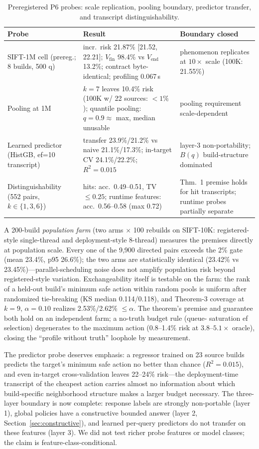 \documentclass{article}
\begin{document}
\begin{table}[t]
\centering
\caption{Preregistered P6 probes: scale replication, pooling boundary, predictor transfer, and transcript
distinguishability.}
\label{tab:p6}
\footnotesize
\setlength{\tabcolsep}{3pt}
\begin{tabular}{p{3.2cm}p{6.3cm}p{4.2cm}}
\toprule
Probe & Result & Boundary closed \\
\midrule
SIFT-1M cell (prereg.; 8 builds, 500 q) & incr.\ risk 21.87\% [21.52, 22.21]; $V_{\mathrm{fin}}$ 98.4\% vs $V_{\mathrm{end}}$ 13.2\%; contract byte-identical; profiling 0.067\,s & phenomenon replicates at $10\times$ scale (100K: 21.55\%) \\
Pooling at 1M & $k{=}7$ leaves 10.4\% risk (100K w/ 22 sources: $<1\%$); quantile pooling: $q{=}0.9 \approx$ max, median unusable & pooling requirement scale-dependent \\
Learned predictor (HistGB, ef{=}10 transcript) & transfer 23.9\%/21.2\% vs naive 21.1\%/17.3\%; in-target CV 24.1\%/22.2\%; $R^2=0.015$ & layer-3 non-portability; $B(q)$ build-structure dominated \\
Distinguishability (552 pairs, $k\in\{1,3,6\}$) & hits: acc.\ 0.49--0.51, TV $\le0.25$; runtime features: acc.\ 0.56--0.58 (max 0.72) & Thm.~1 premise holds for hit transcripts; runtime probes partially separate \\
\bottomrule
\end{tabular}
\end{table}

A 200-build \emph{population farm} (two arms $\times$ 100 rebuilds on SIFT-10K: registered-style
single-thread and deployment-style 8-thread) measures the premises directly at population scale. Every one
of the 9{,}900 directed pairs exceeds the 2\% gate (mean 23.4\%, p95 26.6\%); the two arms are
statistically identical (23.42\% vs 23.45\%)---parallel-scheduling noise does not amplify population risk
beyond registered-style variation. Exchangeability itself is testable on the farm: the rank of a held-out
build's minimum safe action within random pools is uniform after randomized tie-breaking (KS median
0.114/0.118), and Theorem-3 coverage at $k{=}9$, $\alpha{=}0.10$ realizes 2.53\%/2.62\% $\le\alpha$.
The theorem's premise and guarantee both hold on an independent farm; a no-truth budget rule (queue-
saturation ef selection) degenerates to the maximum action (0.8--1.4\% risk at $3.8$--$5.1\times$ oracle),
closing the ``profile without truth'' loophole by measurement.

The predictor probe deserves emphasis: a regressor trained on 23 source builds predicts the target's
minimum safe action no better than chance ($R^2=0.015$), and even in-target cross-validation leaves
22--24\% risk---the deployment-time transcript of the cheapest action carries almost no information about
which build-specific neighborhood structure makes a larger budget necessary. The three-layer boundary is
now complete: response labels are strongly non-portable (layer 1), global policies have a constructive
bounded answer (layer 2, Section~\ref{sec:constructive}), and learned per-query predictors do not transfer
on these features (layer 3). We did not test richer probe features or model classes; the claim is
feature-class-conditional.
\end{document}
